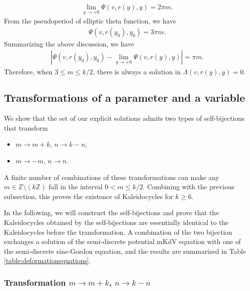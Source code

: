\documentclass[10pt,leqno]{amsart}
\numberwithin{equation}{section}
\begin{document}
\begin{align}
    \lim_{y\to +0}\Psi(v,r(y), y)=2\pi m.
\end{align}
From the pseudoperiod of elliptic theta function, we have
\begin{align}
    \Psi(v,r(y_0), y_0)=3\pi m.
\end{align}
Summarizing the above discussion, we have
\begin{align}
    \left |\Psi(v,r(y_0), y_0)-\lim_{y\to +0}\Psi(v,r(y), y)\right |=\pi m.
\end{align}
Therefore, when $3\leq m\leq k/2$, there is always a solution in $\Lambda(v,r(y), y)=0$.
\subsection{Transformations of a parameter and a variable}\label{subsection:Transformations of a parameter}
We show that the set of our explicit solutions admits two
types of self-bijections that transform
\begin{itemize}
    \item $m\rightarrow m+k$, $n\rightarrow k-n$,
    \item $m\rightarrow -m$, $n\rightarrow n$.
\end{itemize}
A finite number of combinations of these transformations can make any $m\in\mathbb{Z}\setminus(k\mathbb{Z})$ fall in the interval $0<m\leq k/2$. Combining with the previous subsection, this proves the existence of Kaleidocycles for $k\ge 6$.

In the following, we will construct the self-bijections and prove that the Kaleidocycles obtained by the self-bijections are essentially identical to the Kaleidocycles before the transformation.
A combination of the two bijection exchanges a solution of the semi-discrete potential mKdV equation with one of the semi-discrete sine-Gordon equation, and the results are summarized in Table \ref{table:deformationequations}.
\subsubsection{Transformation $m\rightarrow m+k$, $n\rightarrow k-n$}\label{subsubsection:m+k}
\end{document}
